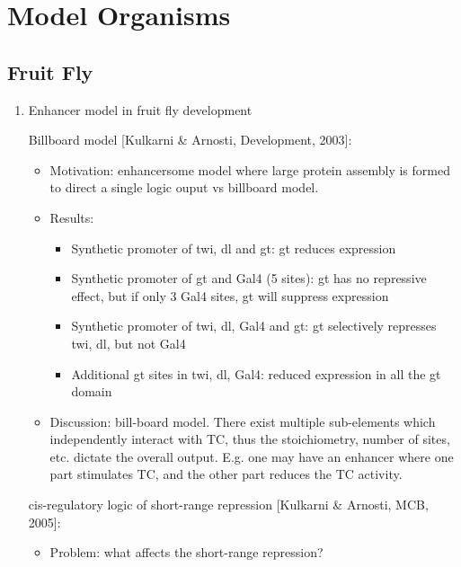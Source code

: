 \documentclass{report}
\begin{document}
\chapter{Model Organisms}

\section{Fruit Fly}
\begin{enumerate}
	
	\item{Enhancer model in fruit fly development}
	
	Billboard model [Kulkarni \& Arnosti, Development, 2003]:
	\begin{itemize}
		\item Motivation: enhancersome model where large protein assembly is formed to direct a single logic ouput vs billboard model.  
		
		\item Results:
		\begin{itemize}
			\item Synthetic promoter of twi, dl and gt: gt reduces expression
			\item Synthetic promoter of gt and Gal4 (5 sites): gt has no repressive effect, but if only 3 Gal4 sites, gt will suppress expression
			\item Synthetic promoter of twi, dl, Gal4 and gt: gt selectively represses twi, dl, but not Gal4
			\item Additional gt sites in twi, dl, Gal4: reduced expression in all the gt domain 
		\end{itemize}
		
		\item Discussion: bill-board model. There exist multiple sub-elements which independently interact with TC, thus the stoichiometry, number of sites, etc. dictate the overall output. E.g. one may have an enhancer where one part stimulates TC, and the other part reduces the TC activity. 
	\end{itemize}
	
	cis-regulatory logic of short-range repression [Kulkarni \& Arnosti, MCB, 2005]:
	\begin{itemize}
		\item Problem: what affects the short-range repression?
		

\end{itemize}
\end{enumerate}
\end{document}
